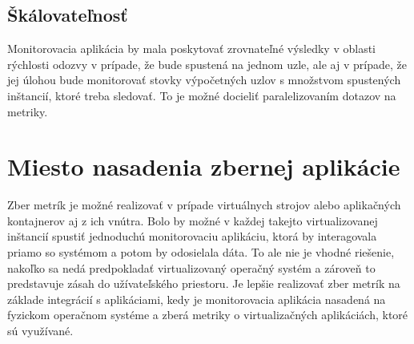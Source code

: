 \documentclass[11pt,final,oneside]{fithesis}
\begin{document}
\subsection{Škálovateľnosť}
Monitorovacia aplikácia by mala poskytovať zrovnateľné výsledky v oblasti rýchlosti odozvy v prípade, že bude spustená na jednom uzle, ale aj v prípade, že jej úlohou bude monitorovať stovky 
výpočetných uzlov s množstvom spustených inštancií, ktoré treba sledovať. To je možné docieliť paralelizovaním dotazov na metriky.

\section{Miesto nasadenia zbernej aplikácie}
Zber metrík je možné realizovať v prípade virtuálnych strojov alebo aplikačných kontajnerov aj z ich vnútra. Bolo by možné v každej
takejto virtualizovanej inštancií spustiť jednoduchú monitorovaciu aplikáciu, ktorá by interagovala priamo so systémom a potom by odosielala dáta.
To ale nie je vhodné riešenie, nakoľko sa nedá predpokladať virtualizovaný operačný systém a zároveň to predstavuje zásah do užívateľského
priestoru. Je lepšie realizovať zber metrík na základe integrácií s aplikáciami, kedy je monitorovacia aplikácia nasadená na fyzickom
operačnom systéme a zberá metriky o virtualizačných aplikáciách, ktoré sú využívané.
\end{document}
